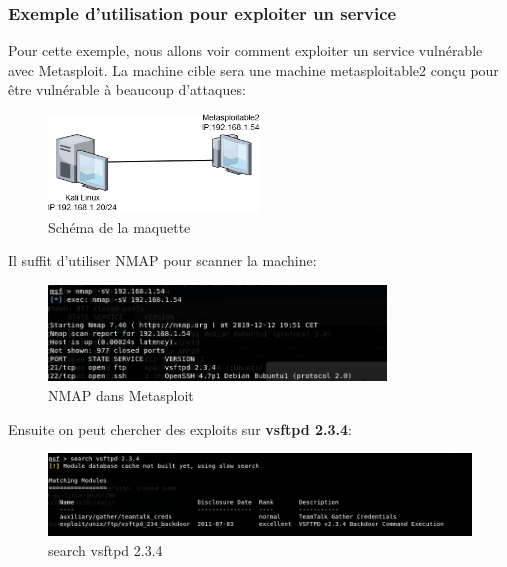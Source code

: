\subsubsection{Exemple d'utilisation pour exploiter un service}

Pour cette exemple, nous allons voir comment exploiter un service vulnérable avec Metasploit. La machine cible sera une machine metasploitable2 conçu pour être vulnérable à beaucoup d'attaques:

\begin{figure}[htp!]
  \centering
  \setlength\figureheight{7cm}
  \setlength\figurewidth{9cm}
  \includegraphics[width=0.5\textwidth]{oui/Ancien/imangeancien/metasploit/schema.png}
  \caption{Schéma de la maquette}
  \label{fig:courbe-tikz}
\end{figure}

\newpage

Il suffit d'utiliser NMAP pour scanner la machine:
\begin{figure}[htp!]
  \centering
  \setlength\figureheight{7cm}
  \setlength\figurewidth{9cm}
  \includegraphics[width=0.8\textwidth]{oui/Ancien/imangeancien/metasploit/nmap.PNG}
  \caption{NMAP dans Metasploit}
  \label{fig:courbe-tikz}
\end{figure}

Ensuite on peut chercher des exploits sur \textbf{vsftpd 2.3.4}:
\begin{figure}[htp!]
  \centering
  \setlength\figureheight{7cm}
  \setlength\figurewidth{9cm}
  \includegraphics[width=1\textwidth]{oui/Ancien/imangeancien/metasploit/ftp.PNG}
  \caption{search vsftpd 2.3.4}
  \label{fig:courbe-tikz}
\end{figure}

